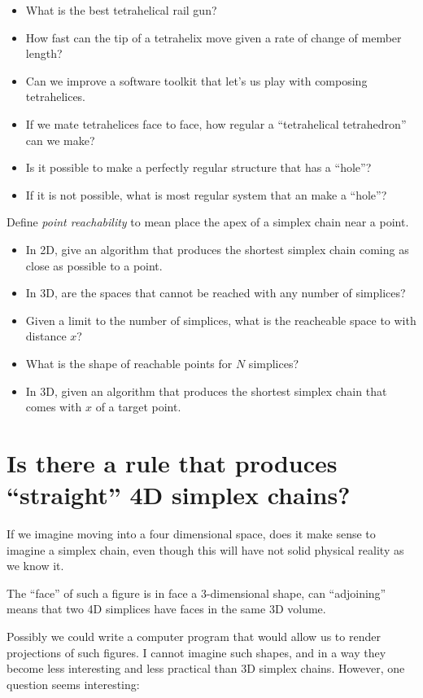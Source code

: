 \documentclass[11pt]{article}
\begin{document}
\begin{itemize}
\item What is the best tetrahelical rail gun?
\item How fast can the tip of a tetrahelix move given a rate of change of member length?
\item Can we improve a software toolkit that let's us play with composing tetrahelices.
\item If we mate tetrahelices face to face, how regular a ``tetrahelical tetrahedron'' can we make?
\item Is it possible to make a perfectly regular structure that has a ``hole''?
\item If it is not possible, what is most regular system that an make a ``hole''?
\end{itemize}

Define {\em point reachability} to mean place the apex of a simplex chain near a point.
\begin{itemize}
\item In 2D, give an algorithm that produces the shortest simplex chain coming as close as possible to a point.
\item In 3D, are the spaces that cannot be reached with any number of simplices?
\item Given a limit to the number of simplices, what is the reacheable space to with distance $x$?
\item What is the shape of reachable points for $N$ simplices?
  \item In 3D, given an algorithm that produces the shortest simplex chain that comes with $x$ of a target point.
  \end{itemize}


\section{Is there a rule that produces ``straight'' 4D simplex chains?}

If we imagine moving into a four dimensional space, does it make sense to imagine a simplex chain, even though this will have
not solid physical reality as we know it.

The ``face'' of such a figure is in face a 3-dimensional shape, can ``adjoining'' means that two 4D simplices have faces in the same 3D volume.

Possibly we could write a computer program that would allow us to render projections of such figures.
I cannot imagine such shapes, and in a way they become less interesting and less practical than 3D simplex chains.
However, one question seems interesting:
\end{document}
